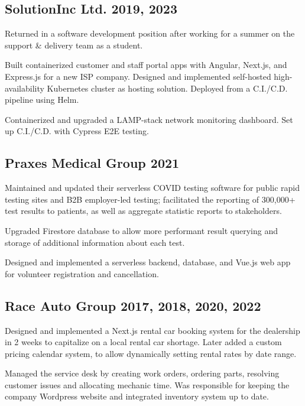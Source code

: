 \documentclass[letter,10pt]{article}
\begin{document}
\subsection{{SolutionInc Ltd. \hfill 2019, 2023}}
\begin{zitemize}
\item Returned in a software development position after working for a summer on the support \& delivery team as a student.
\item Built containerized customer and staff portal apps with Angular, Next.js, and Express.js for a new ISP company. Designed and implemented self-hosted high-availability Kubernetes cluster as hosting solution. Deployed from a C.I./C.D. pipeline using Helm.
\item Containerized and upgraded a LAMP-stack network monitoring dashboard. Set up C.I./C.D. with Cypress E2E testing.
\end{zitemize}

\subsection{{Praxes Medical Group \hfill 2021}}
\begin{zitemize}
\item Maintained and updated their serverless COVID testing software for public rapid testing sites and B2B employer-led testing; facilitated the reporting of 300,000+ test results to patients, as well as aggregate statistic reports to stakeholders.
\item Upgraded Firestore database to allow more performant result querying and storage of additional information about each test.
\item Designed and implemented a serverless backend, database, and Vue.js web app for volunteer registration and cancellation.
\end{zitemize}

\subsection{{Race Auto Group \hfill 2017, 2018, 2020, 2022}}
\begin{zitemize}
\item Designed and implemented a Next.js rental car booking system for the dealership in 2 weeks to capitalize on a local rental car shortage. Later added a custom pricing calendar system, to allow dynamically setting rental rates by date range.
\item Managed the service desk by creating work orders, ordering parts, resolving customer issues and allocating mechanic time. Was responsible for keeping the company Wordpress website and integrated inventory system up to date.
\end{zitemize}
\end{document}
